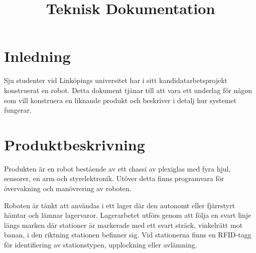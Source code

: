 \documentclass[a4paper,12pt]{article}
\title{Teknisk Dokumentation}
\renewcommand{\thepage}{\roman{page}}
\begin{document}
\LIPStitelsida

\begin{LIPSprojektidentitet}
\end{LIPSprojektidentitet}


\renewcommand*\contentsname{Innehåll}
\begin{spacing}{0.5}
\tableofcontents{}
\end{spacing}
\newpage

\begin{LIPSdokumenthistorik}
\end{LIPSdokumenthistorik}
\newpage

\renewcommand{\thepage}{\arabic{page}}
\setcounter{page}{1}

\section{Inledning}
Sju studenter vid Linköpings universitet har i sitt kandidatarbetsprojekt konstruerat en robot. Detta dokument tjänar till att vara ett underlag för någon som vill konstruera en liknande produkt och beskriver i detalj hur systemet fungerar.

\section{Produktbeskrivning}
Produkten är en robot bestående av ett chassi av plexiglas med fyra hjul, sensorer, en arm och styrelektronik. Utöver detta finns programvara för övervakning och manövrering av roboten.

Roboten är tänkt att användas i ett lager där den autonomt eller fjärrstyrt hämtar och lämnar lagervaror. Lagerarbetet utförs genom att följa en svart linje längs marken där stationer är markerade med ett svart sträck, vinkelrätt mot banan, i den riktning stationen befinner sig. Vid stationerna finns en RFID-tagg för identifiering av stationstypen, upplockning eller avlämning.
\end{document}
